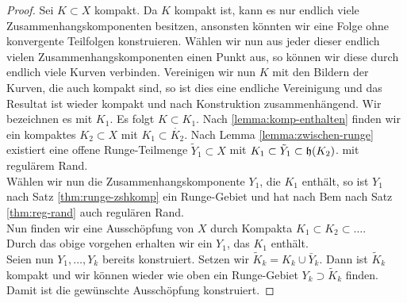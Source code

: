 \begin{proof}
  Sei $K \subset X$ kompakt. Da $K$ kompakt ist, kann es nur endlich
  viele Zusammenhangskomponenten besitzen, ansonsten könnten wir eine
  Folge ohne konvergente Teilfolgen konstruieren. Wählen wir nun aus
  jeder dieser endlich vielen Zusammenhangskomponenten einen Punkt
  aus, so können wir diese durch endlich viele Kurven
  verbinden. Vereinigen wir nun $K$ mit den Bildern der Kurven, die
  auch kompakt sind, so ist dies eine endliche Vereinigung und das
  Resultat ist wieder kompakt und nach Konstruktion
  zusammenhängend. Wir bezeichnen es mit $K_1$. Es folgt $K \subset
  K_1$. Nach \ref{lemma:komp-enthalten} finden wir ein kompaktes $K_2
  \subset X$ mit $K_1 \subset \mathring{K_2}$. Nach Lemma
  \ref{lemma:zwischen-runge}
  existiert eine offene Runge-Teilmenge $\tilde Y_1 \subset X$ mit
  $K_1 \subset \tilde Y_1 \subset \mathfrak{h}(K_2)$. mit regulärem Rand. \\
  Wählen wir nun die Zusammenhangskomponente $Y_1$, die $K_1$ enthält,
  so ist $Y_1$ nach Satz \ref{thm:runge-zshkomp} ein Runge-Gebiet
  und hat nach Bem nach Satz \ref{thm:reg-rand} auch regulären Rand. \\
  Nun finden wir eine Ausschöpfung von $X$ durch Kompakta $K_1 \subset
  K_2 \subset \dots$. \\
  Durch das obige vorgehen erhalten wir ein $Y_1$, das $K_1$
  enthält.\\
  Seien nun $Y_1, \dots, Y_k$ bereits konstruiert. Setzen wir $\tilde
  K_k = K_k \cup \bar Y_k$. Dann ist $\tilde K_k$ kompakt und wir
  können wieder wie oben ein Runge-Gebiet $Y_k \supset \tilde K_k$
  finden.\\
  Damit ist die gewünschte Ausschöpfung konstruiert.
\end{proof}

